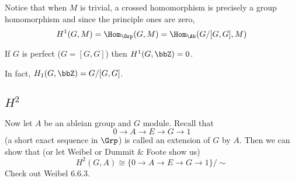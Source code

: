 \documentclass[12pt]{article}
\begin{document}
Notice that when $M$ is trivial, a crossed homomorphism is precisely a group homomorphism and since the 
principle ones are zero, 
\[H^1(G,M)=\Hom_\Grp(G,M)=\Hom_\Ab(G/[G,G],M)\]
\begin{cor}
	If $G$ is perfect ($G=[G,G]$) then $H^1(G,\bbZ)=0$.
\end{cor}
\begin{rmk}
	In fact, $H_1(G,\bbZ)=G/[G,G]$.
\end{rmk}

\subsection{$H^2$}
Now let $A$ be an ableian group and $G$ module. Recall that 
\[0\to A\to E\to G\to 1\]
(a short exact sequence in $\Grp$) is called an extension of $G$ by $A$. Then we can show that (or let Weibel or Dummit \& Foote show us)
\[H^2(G,A)\cong \{0\to A\to E\to G\to 1\}/\sim\]
Check out Weibel 6.6.3.
\end{document}
